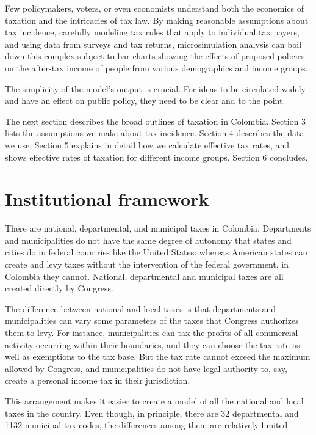 \documentclass[12pt]{article}
\begin{document}
Few policymakers, voters, or even economists understand both
the economics of taxation
and the intricacies of tax law.
By making reasonable assumptions about tax incidence,
carefully modeling tax rules that apply to individual tax payers,
and using data from surveys and tax returns,
microsimulation analysis can boil down this complex subject to
bar charts showing the effects of proposed policies
on the after-tax income of people from various demographics and income groups.

The simplicity of the model's output is crucial.
For ideas to be circulated widely and have an effect on public policy,
they need to be clear and to the point.

The next section describes the broad outlines of taxation in Colombia.
Section 3 lists the assumptions we make about tax incidence.
Section 4 describes the data we use.
Section 5 explains in detail how we calculate effective tax rates,
and shows effective rates of taxation for different income groups.
Section 6 concludes.

\section{Institutional framework}

\iffalse
    [[SOMEONE:
    We should update all the numbers in this section,
    including the tables it references.]]
\fi

There are national, departmental, and municipal taxes in Colombia.
Departments and municipalities do not have the same degree of autonomy
that states and cities do in federal countries like the United States:
whereas American states can create and levy taxes
without the intervention of the federal government,
in Colombia they cannot.
National, departmental and municipal taxes
are all created directly by Congress.

The difference between national and local taxes
is that departments and municipalities can vary
some parameters of the taxes that Congress authorizes them to levy.
For instance, municipalities can tax the profits of
all commercial activity occurring within their boundaries,
and they can choose the tax rate as well as exemptions to the tax base.
But the tax rate cannot exceed the maximum allowed by Congress,
and municipalities do not have legal authority to, say,
create a personal income tax in their jurisdiction.

This arrangement makes it easier to create a model
of all the national and local taxes in the country.
Even though, in principle,
there are 32 departmental and 1132 municipal tax codes,
the differences among them are relatively limited.
\end{document}
